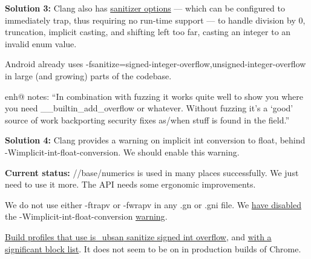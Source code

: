 \documentclass[a4paper,12pt,notitlepage,twoside,openright]{article}
\newcommand{\uline}[1]{#1}
\begin{document}
{\textbf{Solution 3:} Clang also
has \href{https://www.google.com/url?q=https://clang.llvm.org/docs/UndefinedBehaviorSanitizer.html\&sa=D\&source=editors\&ust=1631944129062000\&usg=AOvVaw1WcT_P8zjRqDFzV4ZI1TJT}{\uline{sanitizer
options}} --- which can be configured to immediately trap, thus
requiring no run-time support --- to handle division by 0, truncation,
implicit casting, and shifting left too far, casting an integer to an
invalid enum value.

Android already
uses -fsanitize=signed-integer-overflow,unsigned-integer-overflow in
large (and growing) parts of the codebase.

enh@ notes: ``In combination with fuzzing it works quite well to show
you where you need \_\_builtin\_add\_overflow or whatever. Without
fuzzing it's a `good' source of work backporting security fixes as/when
stuff is found in the field.''

\textbf{Solution 4:} Clang provides a warning on implicit int conversion
to float, behind -Wimplicit-int-float-conversion. We should enable this
warning.

\textbf{Current status:} //base/numerics is used in many places
successfully. We just need to use it more. The API needs some ergonomic
improvements.

We do not use either -ftrapv or -fwrapv in any .gn or .gni file.
We \href{https://www.google.com/url?q=https://crbug.com/989932\&sa=D\&source=editors\&ust=1631944129063000\&usg=AOvVaw2EeNXbT-C5RHlx1OGnSA00}{\uline{have
disabled}} the -Wimplicit-int-float-conversion \href{https://www.google.com/url?q=https://source.chromium.org/chromium/chromium/src/\%2B/main:build/config/compiler/BUILD.gn;drc\%3Dab531c265c533cba1c2f6d8240cc0bf7679f605a;l\%3D1611\&sa=D\&source=editors\&ust=1631944129063000\&usg=AOvVaw0y22xRHB_K05IyKVdiN47i}{\uline{warning}}.

\uline{\href{https://www.google.com/url?q=https://source.chromium.org/search?q\%3Dsanitize\%253Dsigned-integer-overflow\%26sq\%3D\%26ss\%3Dchromium\&sa=D\&source=editors\&ust=1631944129064000\&usg=AOvVaw3X2yYb0iYbcUwuPk3SlZUw}{Build
profiles that
use is\_ubsan}\href{https://www.google.com/url?q=https://source.chromium.org/search?q\%3Dsanitize\%253Dsigned-integer-overflow\%26sq\%3D\%26ss\%3Dchromium\&sa=D\&source=editors\&ust=1631944129065000\&usg=AOvVaw1TV5lWdf0gJaEL47oeTXN4}{ sanitize
signed int overflow}},
and \href{https://www.google.com/url?q=https://source.chromium.org/chromium/chromium/src/\%2B/master:tools/ubsan/blacklist.txt?q\%3Dblacklist.txt\%26ss\%3Dchromium\&sa=D\&source=editors\&ust=1631944129065000\&usg=AOvVaw3fCUMhabQSj7I8LGKJMnqC}{\uline{with
a significant block list}}. It does not seem to be on in production
builds of Chrome.

}
\end{document}

